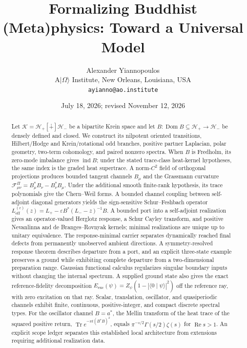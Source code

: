 \documentclass[11pt,reqno]{scrartcl}
\title{\textbf{Formalizing Buddhist (Meta)physics: Toward a Universal Model}}
\author{Alexander Yiannopoulos\\[2pt]
\small A$\lvert\Omega\rangle$ Institute, New Orleans, Louisiana, USA\\
\small\texttt{ayianno@ao.institute}}
\date{July 18, 2026; revised November 12, 2026}
\newcommand{\scrK}{\mathscr K}
\newcommand{\scrHp}{\mathscr H_{+}}
\newcommand{\scrHm}{\mathscr H_{-}}
\newcommand{\braket}[2]{\langle #1\mid #2\rangle}
\DeclareMathOperator{\Dom}{Dom}
\DeclareMathOperator{\ind}{ind}
\newcommand{\dsum}{\mathbin{[\dotplus]}}
\newcommand{\gaugeF}{\mathcal F}
\theoremstyle{plain}
\theoremstyle{definition}
\theoremstyle{remark}
\begin{document}
\maketitle

\begin{abstract}
\noindent
Let \(\scrK=\scrHp\dsum\scrHm\) be a bipartite Krein space and let
\(B:\Dom B\subseteq\scrHp\to\scrHm\) be densely defined and closed.  We
construct its nilpotent oriented transitions, Hilbert/Hodge and
Krein/rotational odd branches, positive partner Laplacian, polar geometry,
two-term cohomology, and paired nonzero spectra.  When \(B\) is Fredholm,
its zero-mode imbalance gives \(\ind B\); under the stated trace-class
heat-kernel hypotheses, the same index is the graded heat supertrace.  A
norm-\(C^2\) field of orthogonal projections produces bounded tangent channels
\(B_\mu\) and the Grassmann curvature
\(\gaugeF_{\mu\nu}^{\Pi}=B_\mu^*B_\nu-B_\nu^*B_\mu\).  Under the additional
smooth finite-rank hypothesis, its trace polynomials give the Chern--Weil
forms.  A bounded channel coupling
between self-adjoint diagonal generators yields the sign-sensitive
Schur--Feshbach operator
\(L_{\mathrm{eff}}^{(\varepsilon)}(z)=L_+-\varepsilon
B^*(L_--z)^{-1}B\).  A bounded port into a self-adjoint realization gives
an operator-valued Herglotz response, a Schur Cayley transform, and positive
Nevanlinna and de Branges--Rovnyak kernels; minimal realizations are unique up
to unitary equivalence.  The response-minimal carrier separates
dynamically reached final defects from permanently unobserved ambient
directions.  A symmetry-resolved response theorem describes departure
from a port, and an explicit three-state example preserves a ground
while exhibiting complete departure from a two-dimensional preparation
range.  Gaussian functional calculus regularizes
singular boundary inputs without changing the internal spectrum.  A supplied
ground state also gives the exact reference-fidelity decomposition
\(E_{\mathrm{exc}}(\psi)=Z_\psi(1-|\braket0\psi|^2)\) off the reference ray,
with zero excitation on that ray.  Scalar,
translation, oscillator, and quasiperiodic channels exhibit finite,
continuous, positive-integer, and compact discrete spectral types.  For the
oscillator channel \(B=a^*\), the Mellin transform of the heat trace of the
squared positive return,
\(\operatorname{Tr}e^{-\pi t(B^*B)^2}\), equals
\(\pi^{-s/2}\Gamma(s/2)\zeta(s)\) for \(\operatorname{Re}s>1\).  An
explicit scope ledger separates this established local architecture from
extensions requiring additional realization data.
\end{abstract}
\end{document}
